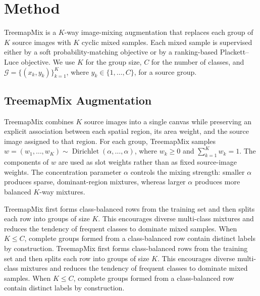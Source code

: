 \section{Method}\label{sec:method}

TreemapMix is a $K$-way image-mixing augmentation that replaces each group of $K$ source images with $K$ cyclic mixed samples. Each mixed sample is supervised either by a soft probability-matching objective or by a ranking-based Plackett--Luce objective. We use $K$ for the group size, $C$ for the number of classes, and \(\mathcal{G}=\{(x_k,y_k)\}_{k=1}^{K}\), where \(y_k\in\{1,\dots,C\}\), for a source group.

\subsection{TreemapMix Augmentation}\label{sec:labelmix}

TreemapMix combines $K$ source images into a single canvas while preserving an explicit association between each spatial region, its area weight, and the source image assigned to that region. For each group, TreemapMix samples \(w=(w_1,\dots,w_K)\sim\operatorname{Dirichlet}(\alpha,\dots,\alpha)\), where \(w_k\ge 0\) and \(\sum_{k=1}^{K}w_k=1\). The components of $w$ are used as slot weights rather than as fixed source-image weights. The concentration parameter $\alpha$ controls the mixing strength: smaller $\alpha$ produces sparse, dominant-region mixtures, whereas larger $\alpha$ produces more balanced $K$-way mixtures.

TreemapMix first forms class-balanced rows from the training set and then splits each row into groups of size $K$. This encourages diverse multi-class mixtures and reduces the tendency of frequent classes to dominate mixed samples. When $K\le C$, complete groups formed from a class-balanced row contain distinct labels by construction.
TreemapMix first forms class-balanced rows from the training set and then splits each row into groups of size $K$. This encourages diverse multi-class mixtures and reduces the tendency of frequent classes to dominate mixed samples. When $K\le C$, complete groups formed from a class-balanced row contain distinct labels by construction.

